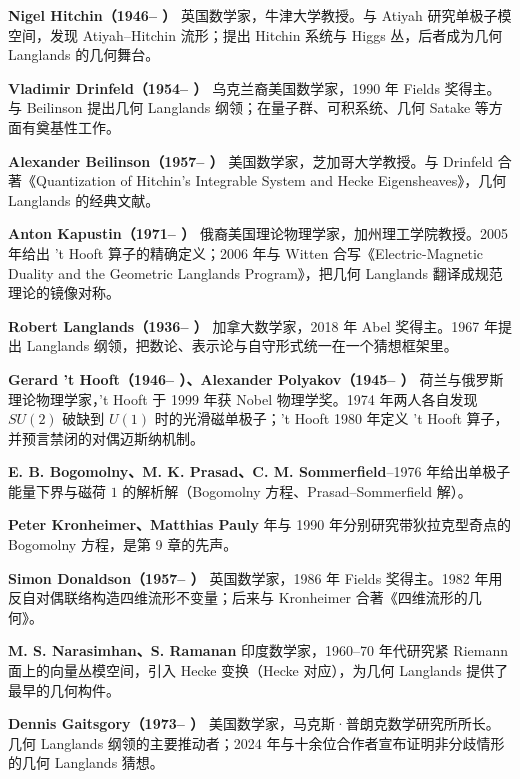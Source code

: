 \medskip
\noindent\textbf{Nigel Hitchin（1946-- ）}\quad
英国数学家，牛津大学教授。与 Atiyah 研究单极子模空间，发现 Atiyah--Hitchin 流形；提出 Hitchin 系统与 Higgs 丛，后者成为几何 Langlands 的几何舞台。

\medskip
\noindent\textbf{Vladimir Drinfeld（1954-- ）}\quad
乌克兰裔美国数学家，1990 年 Fields 奖得主。与 Beilinson 提出几何 Langlands 纲领；在量子群、可积系统、几何 Satake 等方面有奠基性工作。

\medskip
\noindent\textbf{Alexander Beilinson（1957-- ）}\quad
美国数学家，芝加哥大学教授。与 Drinfeld 合著《Quantization of Hitchin's Integrable System and Hecke Eigensheaves》，几何 Langlands 的经典文献。

\medskip
\noindent\textbf{Anton Kapustin（1971-- ）}\quad
俄裔美国理论物理学家，加州理工学院教授。2005 年给出 't Hooft 算子的精确定义；2006 年与 Witten 合写《Electric-Magnetic Duality and the Geometric Langlands Program》，把几何 Langlands 翻译成规范理论的镜像对称。

\medskip
\noindent\textbf{Robert Langlands（1936-- ）}\quad
加拿大数学家，2018 年 Abel 奖得主。1967 年提出 Langlands 纲领，把数论、表示论与自守形式统一在一个猜想框架里。

\medskip
\noindent\textbf{Gerard 't Hooft（1946-- ）、Alexander Polyakov（1945-- ）}\quad
荷兰与俄罗斯理论物理学家，'t Hooft 于 1999 年获 Nobel 物理学奖。1974 年两人各自发现 $SU(2)$ 破缺到 $U(1)$ 时的光滑磁单极子；'t Hooft 1980 年定义 't Hooft 算子，并预言禁闭的对偶迈斯纳机制。

\medskip
\noindent\textbf{E. B. Bogomolny、M. K. Prasad、C. M. Sommerfield}--1976 年给出单极子能量下界与磁荷 $1$ 的解析解（Bogomolny 方程、Prasad--Sommerfield 解）。

\medskip
\noindent\textbf{Peter Kronheimer、Matthias Pauly} 年与 1990 年分别研究带狄拉克型奇点的 Bogomolny 方程，是第 9 章的先声。

\medskip
\noindent\textbf{Simon Donaldson（1957-- ）}\quad
英国数学家，1986 年 Fields 奖得主。1982 年用反自对偶联络构造四维流形不变量；后来与 Kronheimer 合著《四维流形的几何》。

\medskip
\noindent\textbf{M. S. Narasimhan、S. Ramanan}\quad
印度数学家，1960--70 年代研究紧 Riemann 面上的向量丛模空间，引入 Hecke 变换（Hecke 对应），为几何 Langlands 提供了最早的几何构件。

\medskip
\noindent\textbf{Dennis Gaitsgory（1973-- ）}\quad
美国数学家，马克斯·普朗克数学研究所所长。几何 Langlands 纲领的主要推动者；2024 年与十余位合作者宣布证明非分歧情形的几何 Langlands 猜想。
